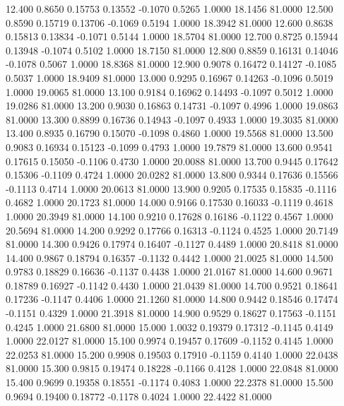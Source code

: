   12.400   0.8650   0.15753   0.13552  -0.1070   0.5265   1.0000  18.1456  81.0000
  12.500   0.8590   0.15719   0.13706  -0.1069   0.5194   1.0000  18.3942  81.0000
  12.600   0.8638   0.15813   0.13834  -0.1071   0.5144   1.0000  18.5704  81.0000
  12.700   0.8725   0.15944   0.13948  -0.1074   0.5102   1.0000  18.7150  81.0000
  12.800   0.8859   0.16131   0.14046  -0.1078   0.5067   1.0000  18.8368  81.0000
  12.900   0.9078   0.16472   0.14127  -0.1085   0.5037   1.0000  18.9409  81.0000
  13.000   0.9295   0.16967   0.14263  -0.1096   0.5019   1.0000  19.0065  81.0000
  13.100   0.9184   0.16962   0.14493  -0.1097   0.5012   1.0000  19.0286  81.0000
  13.200   0.9030   0.16863   0.14731  -0.1097   0.4996   1.0000  19.0863  81.0000
  13.300   0.8899   0.16736   0.14943  -0.1097   0.4933   1.0000  19.3035  81.0000
  13.400   0.8935   0.16790   0.15070  -0.1098   0.4860   1.0000  19.5568  81.0000
  13.500   0.9083   0.16934   0.15123  -0.1099   0.4793   1.0000  19.7879  81.0000
  13.600   0.9541   0.17615   0.15050  -0.1106   0.4730   1.0000  20.0088  81.0000
  13.700   0.9445   0.17642   0.15306  -0.1109   0.4724   1.0000  20.0282  81.0000
  13.800   0.9344   0.17636   0.15566  -0.1113   0.4714   1.0000  20.0613  81.0000
  13.900   0.9205   0.17535   0.15835  -0.1116   0.4682   1.0000  20.1723  81.0000
  14.000   0.9166   0.17530   0.16033  -0.1119   0.4618   1.0000  20.3949  81.0000
  14.100   0.9210   0.17628   0.16186  -0.1122   0.4567   1.0000  20.5694  81.0000
  14.200   0.9292   0.17766   0.16313  -0.1124   0.4525   1.0000  20.7149  81.0000
  14.300   0.9426   0.17974   0.16407  -0.1127   0.4489   1.0000  20.8418  81.0000
  14.400   0.9867   0.18794   0.16357  -0.1132   0.4442   1.0000  21.0025  81.0000
  14.500   0.9783   0.18829   0.16636  -0.1137   0.4438   1.0000  21.0167  81.0000
  14.600   0.9671   0.18789   0.16927  -0.1142   0.4430   1.0000  21.0439  81.0000
  14.700   0.9521   0.18641   0.17236  -0.1147   0.4406   1.0000  21.1260  81.0000
  14.800   0.9442   0.18546   0.17474  -0.1151   0.4329   1.0000  21.3918  81.0000
  14.900   0.9529   0.18627   0.17563  -0.1151   0.4245   1.0000  21.6800  81.0000
  15.000   1.0032   0.19379   0.17312  -0.1145   0.4149   1.0000  22.0127  81.0000
  15.100   0.9974   0.19457   0.17609  -0.1152   0.4145   1.0000  22.0253  81.0000
  15.200   0.9908   0.19503   0.17910  -0.1159   0.4140   1.0000  22.0438  81.0000
  15.300   0.9815   0.19474   0.18228  -0.1166   0.4128   1.0000  22.0848  81.0000
  15.400   0.9699   0.19358   0.18551  -0.1174   0.4083   1.0000  22.2378  81.0000
  15.500   0.9694   0.19400   0.18772  -0.1178   0.4024   1.0000  22.4422  81.0000
